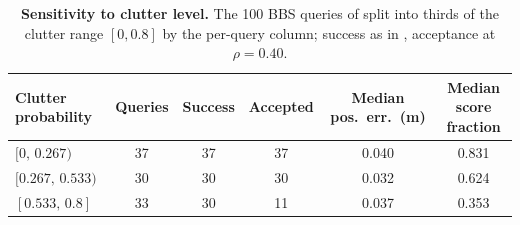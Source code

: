 \begin{table}[t]
\centering
\caption{\textbf{Sensitivity to clutter level.} The 100 BBS queries of  split into thirds of the clutter range $[0,0.8]$ by the per-query  column; success as in , acceptance at $\rho=0.40$.}\label{tab:clutter}
\small
\begin{tabular}{@{}lccccc@{}}
\toprule
Clutter probability & Queries & Success & Accepted & Median pos.\ err.\ (m) & Median score fraction \\
\midrule
$[0,\,0.267)$ & 37 & 37 & 37 & 0.040 & 0.831 \\
$[0.267,\,0.533)$ & 30 & 30 & 30 & 0.032 & 0.624 \\
$[0.533,\,0.8]$ & 33 & 30 & 11 & 0.037 & 0.353 \\
\bottomrule
\end{tabular}
\end{table}
